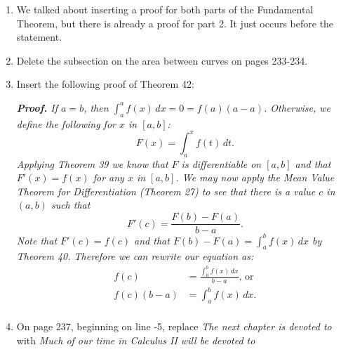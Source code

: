 \documentclass[11pt]{report}
\begin{document}
\begin{enumerate}
{Therefore $F'(x)=f(x)$ as desired. \qedsymbol}

\item We talked about inserting a proof for both parts of the Fundamental Theorem, but there is already a proof for part 2. It just occurs before the statement.

\item Delete the subsection on the area between curves on pages 233-234.


\item Insert the following proof of Theorem 42:

{\slshape {\bfseries Proof.} If $a=b$, then $\int_a^a f(x)\,dx =0=f(a)(a-a)$. Otherwise, we define the following for $x$ in $[a,b]$: \[ F(x)=\int_a^x f(t)\,dt.\] Applying Theorem 39 we know that $F$ is differentiable on $[a,b]$ and that $F'(x)=f(x)$ for any $x$ in $[a,b]$. We may now apply the Mean Value Theorem for Differentiation (Theorem 27) to see that there is a value $c$ in $(a,b)$ such that \[F'(c)=\frac{F(b)-F(a)}{b-a}.\] Note that $F'(c)=f(c)$ and that $F(b)-F(a)=\int_a^b f(x)\,dx$ by Theorem 40. Therefore we can rewrite our equation as: 
\begin{equation*}
\begin{split}
f(c)&=\frac{\int_a^b f(x)\,dx}{b-a}\text{, or}\\
f(c)(b-a)&=\int_a^b f(x)\,dx.\\
\end{split}
\end{equation*}
\qedsymbol
}

\item On page 237, beginning on line -5, replace \emph{The next chapter is devoted to} with \emph{Much of our time in Calculus II will be devoted to}


\end{enumerate}
\end{document}
